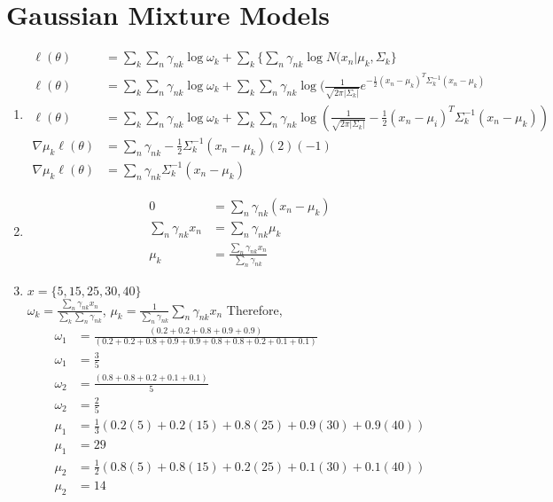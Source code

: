 \documentclass[11pt]{article}
\newcommand{\solution}[1]{{{\color{blue}{\bf Solution:} {#1}}}}
\begin{document}
\section{Gaussian Mixture Models}
\begin{enumerate}
\item
\solution{
\begin{align}
\ell(\theta)  &=\sum_k\sum_n\gamma_{nk}\log\omega_k + \sum_k\{\sum_n\gamma_{nk}\log N (x_n | \mu_k, \Sigma_k\} \\
\ell(\theta)  &=\sum_k\sum_n\gamma_{nk}\log\omega_k + \sum_k\sum_n\gamma_{nk}\log(\tfrac{1}{\sqrt{2\pi |\Sigma_k|}}e^{-\frac{1}{2}(x_n-\mu_k)^T\Sigma_k^{-1}(x_n-\mu_k)} \\
\ell(\theta)  &=\sum_k\sum_n\gamma_{nk}\log\omega_k + \sum_k\sum_n\gamma_{nk}\log(\tfrac{1}{\sqrt{2\pi |\Sigma_k|}}-\tfrac{1}{2}(x_n-\mu_i)^T\Sigma_k^{-1}(x_n-\mu_k)) \\
\nabla\mu_k\ell(\theta) &= \sum_n\gamma_{nk}-\tfrac{1}{2}\Sigma_k^{-1}(x_n-\mu_k)(2)(-1) \\
\nabla\mu_k\ell(\theta) &= \sum_n\gamma_{nk}\Sigma_k^{-1}(x_n-\mu_k)
\end{align}
}
\vspace{1cm}

\item
\solution{
\begin{align}
0 &= \sum_n\gamma_{nk}(x_n-\mu_k) \\
\sum_n\gamma_{nk}x_n &= \sum_n\gamma_{nk}\mu_k \\
\mu_k &= \frac{\sum_n\gamma_{nk}x_n}{\sum_n\gamma_{nk}}
\end{align}
}
\vspace{1cm}

\item
\solution{
$x = \{5, 15, 25, 30, 40\}$ \\
$\omega_k = \frac{\sum_n\gamma_{nk}x_n}{\sum_k\sum_n\gamma_{nk}}$, $\mu_k = \frac{1}{\sum_n\gamma_{nk}}\sum_n\gamma_{nk}x_n$
Therefore,
\begin{align}
\omega_1 &= \frac{(0.2 + 0.2+0.8+0.9+0.9)}{(0.2+0.2+0.8+0.9+0.9+0.8+0.8+0.2+0.1+0.1)} \\
\omega_1 &= \tfrac{3}{5} \\
\omega_2 &= \frac{(0.8+0.8+0.2+0.1+0.1)}{5} \\
\omega_2 &= \tfrac{2}{5} \\
\mu_1 &= \tfrac{1}{3}(0.2(5)+0.2(15)+0.8(25)+0.9(30)+0.9(40)) \\
\mu_1 &= 29 \\
\mu_2 &= \tfrac{1}{2}(0.8(5)+0.8(15)+0.2(25)+0.1(30)+0.1(40)) \\
\mu_2 &= 14
\end{align}
}
\end{enumerate}
\end{document}
